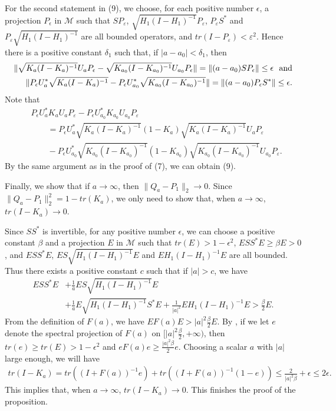 \documentclass[12pt]{article}
\newcommand{\MMM}{\mathcal M}
\begin{document}
{For the second statement in (9), we choose, for each positive number
$\epsilon $, a projection $P_\epsilon$ in $\MMM$ such that
$SP_{\varepsilon}$, $\sqrt{H_{1}(I-H_{1})^{-1}}P_{\varepsilon}$,
$P_{\varepsilon}S^*$ and $P_{\varepsilon}\sqrt{H_{1}(I-H_{1})^{-1}}$
are all bounded operators, and  $tr(I - P_{\varepsilon}) <
\varepsilon^{2}$. Hence there is a positive constant $\delta_{1}$
such that, if $|a-a_{0}| < \delta_{1}$, then
\begin{align*}
\| \sqrt{K_a(I-K_a)^{-1}}U_{a}P_{\epsilon} -
\sqrt{K_{a_0}(I-K_{a_{0}})^{-1}}U_{a_0}P_{\epsilon}  \| = \|(a - a_0)SP_{\epsilon}  \| \leq
\epsilon\,\,\,\,\hbox{and} \\
 \|P_{\epsilon}U_{a}^*\sqrt{K_a(I-K_a)^{-1}} -
P_{\epsilon}U_{a_0}^*\sqrt{K_{a_0}(I-K_{a_{0}})^{-1}} \| = \|(a - a_0)P_{\epsilon}S^{*}  \| \leq
\epsilon.
\end{align*}
Note that
\begin{align*}
&P_{\epsilon}U_a^*K_{a}U_aP_{\varepsilon}
-P_{\epsilon}U_{a_0}^*K_{a_0}U_{a_0}P_{\varepsilon}\\
& \qquad =P_{\epsilon}U_a^*\sqrt{K_{a}(I-K_{a})^{-1}}(1-K_{a})\sqrt{K_{a}(I-K_{a})^{-1}}U_aP_{\varepsilon}\\
& \qquad - P_{\epsilon}U_{a_0}^*\sqrt{K_{a_0}(I-K_{a_0})^{-1}}(1-K_{a_0})\sqrt{K_{a_0}(I-K_{a_0})^{-1}}U_{a_0}P_{\varepsilon}.
\end{align*}
By the same argument as in the proof of (7), we can obtain (9).


Finally, we show that if $a \rightarrow \infty$, then $\|Q_{a} - P_1
\|_{2} \rightarrow 0$. Since $\|Q_{a} - P_1 \|_{2}^{2} = 1 -
tr(K_a)$, we only need to show that, when $a \rightarrow \infty$,
$tr(I-K_a) \rightarrow 0$.

Since $SS^*$ is invertible, for any positive number $\epsilon $, we
can choose a positive constant $\beta$ and a projection $E$ in
$\MMM$ such that $tr(E)
> 1 - \epsilon^2$, $ESS^{*}E \geq \beta E > 0$, and $ESS^{*}E$,
$ES\sqrt{H_{1}(I-H_{1})^{-1}}E$ and $EH_{1}(I-H_{1})^{-1}E$ are all
bounded. Thus there exists a positive constant $c$ such that if $|a|
> c$, we have
\begin{align*}
ESS^{*}E &+ \frac{1}{\overline{a}}ES\sqrt{H_{1}(I-H_{1})^{-1}}E \\
& + \frac{1}{a}E\sqrt{H_{1}(I-H_{1})^{-1}}S^{*}E +
\frac{1}{|a|^2}EH_{1}(I-H_{1})^{-1}E > \frac{\beta}{2}E.
\end{align*}
From the definition of $F(a)$, we have
$EF(a)E>|a|^{2}\frac{\beta}{2}E$. By \cite[Lemma 3.2]{BV}, if we let
$e$ denote the spectral projection of $F(a)$ on
$[|a|^{2}\frac{\beta}{2}, +\infty)$, then $tr(e)\geq tr(E)> 1-
\epsilon^2$ and $e F(a)e \geq \frac{|a|^{2}\beta}{2}e$. Choosing a
scalar $a$ with $|a|$ large enough, we will have
\begin{align*}
tr(I-K_a) = tr((I + F(a))^{-1}e) + tr((I + F(a))^{-1}(1-e))
          \leq \frac{2}{|a|^2\beta} + \epsilon \leq 2\epsilon.
\end{align*}
This implies that, when $a \rightarrow \infty$, $tr(I-K_a)
\rightarrow 0$. This finishes the proof of the proposition.
\vspace{2mm}

}
\end{document}
